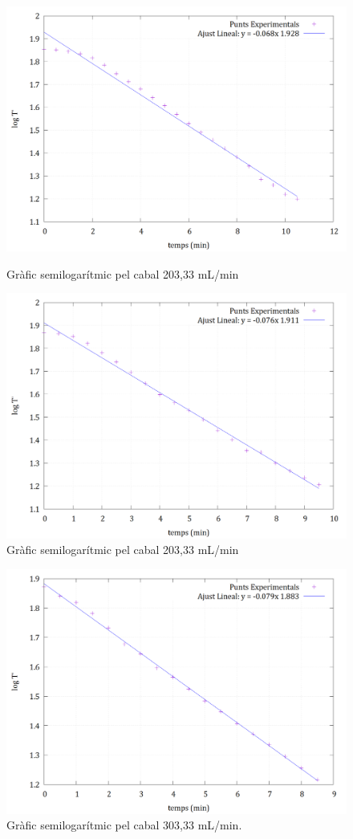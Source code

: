 \documentclass[10pt, twoside]{article}
\begin{document}
\begin{figure}[h!]
    \centering
    \begin{minipage}{0.45\linewidth}
        \centering
        \includegraphics[width=\linewidth]{ajustsemilog203.png}
        \caption{Gràfic semilogarítmic pel cabal 203,33 mL/min}
    \end{minipage}
    \hspace{0.05\linewidth}
    \begin{minipage}{0.45\linewidth}
        \centering
        \includegraphics[width=\linewidth]{ajustsemilog253.png}
        \caption{Gràfic semilogarítmic pel cabal 203,33 mL/min}
    \end{minipage}
\end{figure}

\begin{figure}[H]
    \centering
    \includegraphics[width=0.45\linewidth]{ajustsemilog303.png}
    \caption{Gràfic semilogarítmic pel cabal 303,33 mL/min.}
    \label{fig4}
\end{figure}
\end{document}
